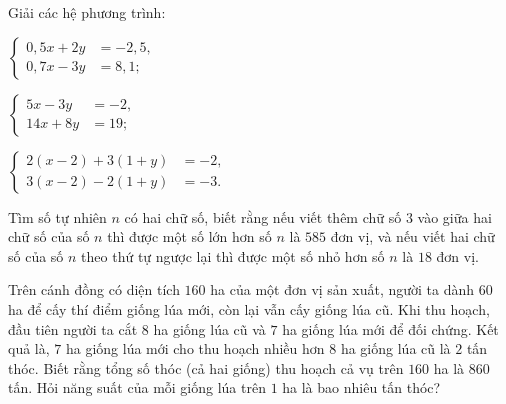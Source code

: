 \begin{exercises}
\begin{questions}[resume=SGK]
        \item Giải các hệ phương trình:
        \begin{questions}
            \item $\left\{
                \begin{aligned}
                    0{,}5x+2y&=-2{,}5,\\
                    0{,}7x-3y&=8{,}1;
                \end{aligned}
                \right.$

            \answerline
            \answerline

            \item $\left\{
                \begin{aligned}
                    5x-3y&=-2,\\
                    14x+8y&=19;
                \end{aligned}
                \right.$

            \answerline
            \answerline

            \item $\left\{
                \begin{aligned}
                    2(x-2)+3(1+y)&=-2,\\
                    3(x-2)-2(1+y)&=-3.
                \end{aligned}
                \right.$

            \answerline
            \answerline
        \end{questions}

        \item Tìm số tự nhiên $n$ có hai chữ số, biết rằng nếu viết thêm chữ số $3$ vào giữa hai chữ số của số $n$ thì được một số lớn hơn số $n$ là $585$ đơn vị, và nếu viết hai chữ số của số $n$ theo thứ tự ngược lại thì được một số nhỏ hơn số $n$ là $18$ đơn vị.

        \answerline
        \answerline
        \answerline

        \item Trên cánh đồng có diện tích $160$ ha của một đơn vị sản xuất, người ta dành $60$ ha để cấy thí điểm giống lúa mới, còn lại vẫn cấy giống lúa cũ. Khi thu hoạch, đầu tiên người ta cắt $8$ ha giống lúa cũ và $7$ ha giống lúa mới để đối chứng. Kết quả là, $7$ ha giống lúa mới cho thu hoạch nhiều hơn $8$ ha giống lúa cũ là $2$ tấn thóc. Biết rằng tổng số thóc (cả hai giống) thu hoạch cả vụ trên $160$ ha là $860$ tấn. Hỏi năng suất của mỗi giống lúa trên $1$ ha là bao nhiêu tấn thóc?


\end{questions}
\end{exercises}
